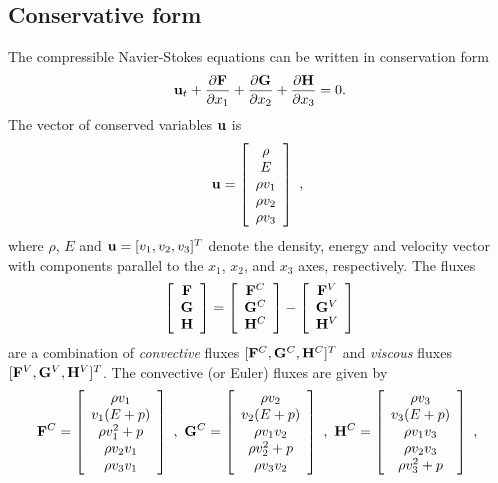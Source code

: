 \documentclass[10pt]{article}
\begin{document}
\subsection{Conservative form} 
The compressible Navier-Stokes equations can be written in
conservation form
$$
   {\bf u}_t + {\partial {\bf F}\over \partial x_1}
         + {\partial {\bf G}\over \partial x_2}
         + {\partial {\bf H}\over \partial x_3}    =  0 .
$$
The vector of conserved variables ${\bf u}$ is
$$
 {\bf u} = \left[ \begin{array}{c}
    \rho \\ E \\ \rho v_1 \\ \rho v_2  \\  \rho v_3
              \end{array}\right]  ~,~
$$
where $\rho$, $E$ and ${\bf u}=[v_1,v_2,v_3]^T$ denote the density, energy and
velocity vector with components parallel to the $x_1$, $x_2$, and $x_3$ axes, respectively.  The fluxes
$$
  \left[ \begin{array}{c}
    {\bf F} \\ {\bf G} \\ {\bf H}
              \end{array}\right]
 =\left[ \begin{array}{c}
    {\bf F}^C \\ {\bf G}^C \\ {\bf H}^C
              \end{array}\right]
 -\left[ \begin{array}{c}
    {\bf F}^V \\ {\bf G}^V \\ {\bf H}^V
              \end{array}\right]
$$
 are a combination of
{\it convective} fluxes $[{\bf F}^C,{\bf G}^C,{\bf H}^C]^T$ and {\it viscous}
fluxes $[{\bf F}^V,{\bf G}^V,{\bf H}^V]^T$.
The convective (or Euler) fluxes are given by
$$
 {\bf F}^C = \left[ \begin{array}{c}
 \rho v_1 \\ v_1(E+p) \\ \rho v_1^2 + p \\ \rho v_2 v_1 \\ \rho v_3 v_1
                \end{array}\right]  ~,~
 {\bf G}^C = \left[ \begin{array}{c}
 \rho v_2 \\ v_2(E+p) \\ \rho v_1 v_2 \\ \rho v_2^2+p \\ \rho v_3 v_2
                \end{array}\right]  ~,~
 {\bf H}^C = \left[ \begin{array}{c}
 \rho v_3 \\ v_3(E+p) \\ \rho v_1 v_3 \\ \rho v_2 v_3 \\ \rho v_3^2+p
                \end{array}\right]  ~,~
$$
\end{document}
